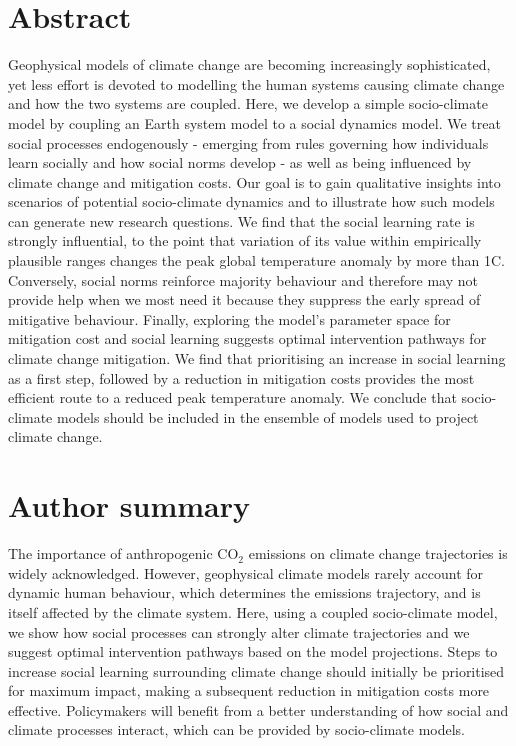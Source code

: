 \documentclass[10pt,letterpaper]{article}
\begin{document}
\section*{Abstract}
Geophysical models of climate change are becoming increasingly sophisticated, yet less effort is devoted to modelling the human systems causing climate change and how the two systems are coupled. Here, we develop a simple socio-climate model by coupling an Earth system model to a social dynamics model. We treat social processes endogenously - emerging from rules governing how individuals learn socially and how social norms develop - as well as being influenced by climate change and mitigation costs. Our goal is to gain qualitative insights into scenarios of potential socio-climate dynamics and to illustrate how such models can generate new research questions. We find that the social learning rate is strongly influential, to the point that variation of its value within empirically plausible ranges changes the peak global temperature anomaly by more than 1\degree C. Conversely, social norms reinforce majority behaviour and therefore may not provide help when we most need it because they suppress the early spread of mitigative behaviour. Finally, exploring the model's parameter space for mitigation cost and social learning suggests optimal intervention pathways for climate change mitigation. We find that prioritising an increase in social learning as a first step, followed by a reduction in mitigation costs provides the most efficient route to a reduced peak temperature anomaly. We conclude that socio-climate models should be included in the ensemble of models used to project climate change.


\section*{Author summary}
The importance of anthropogenic $\text{CO}_2$ emissions on climate change trajectories is widely acknowledged. However, geophysical climate models rarely account for dynamic human behaviour, which determines the emissions trajectory, and is itself affected by the climate system. Here, using a coupled socio-climate model, we show how social processes can strongly alter climate trajectories and we suggest optimal intervention pathways based on the model projections. Steps to increase social learning surrounding climate change should initially be prioritised for maximum impact, making a subsequent reduction in mitigation costs more effective. Policymakers will benefit from a better understanding of how social and climate processes interact, which can be provided by socio-climate models.
\end{document}
